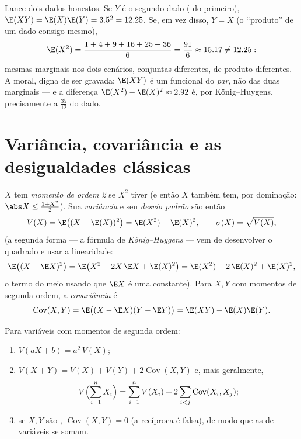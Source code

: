\begin{example}\label{ex:b2:randomvar:productcontrast}
Lance dois dados honestos. Se $Y$ é o segundo dado ( do
primeiro), $\E(XY) = \E(X)\E(Y) = 3.5^2 = 12.25$. Se, em vez disso,
$Y = X$ (o ``produto'' de um dado consigo mesmo),
\[
\E(X^2) = \frac{1 + 4 + 9 + 16 + 25 + 36}{6} = \frac{91}{6}
\approx 15.17 \neq 12.25 :
\]
mesmas  marginais nos dois cenários,  conjuntas diferentes,
 de produto diferentes. A moral, digna de ser gravada:
$\E(XY)$ é um funcional do \emph{par}, não das duas
marginais --- e a diferença $\E(X^2) - \E(X)^2 \approx 2.92$
é, por König--Huygens, precisamente a 
$\frac{35}{12}$ do dado.
\end{example}

\section{Variância, covariância e as desigualdades clássicas}

\begin{definition}\label{def:b2:randomvar:variance}
$X$ tem \emph{momento de ordem 2} se $X^2$ tiver 
(e então $X$ também tem, por dominação: $\abs X \leq \frac{1 +
X^2}{2}$). Sua \emph{variância} e seu \emph{desvio
padrão} são
então
\[
V(X) = \E\bigl((X - \E(X))^2\bigr)
= \E(X^2) - \E(X)^2 ,
\qquad
\sigma(X) = \sqrt{V(X)} ,
\]
(a segunda forma --- a fórmula de \emph{König--Huygens} --- vem de
desenvolver o quadrado e usar a linearidade:
\[
\E\bigl((X - \E X)^2\bigr)
= \E\bigl(X^2 - 2X\,\E X + \E(X)^2\bigr)
= \E(X^2) - 2\,\E(X)^2 + \E(X)^2 ,
\]
o termo do meio usando que $\E X$ é uma constante). Para $X, Y$ com momentos de segunda ordem,
a \emph{covariância} é
\[
\operatorname{Cov}(X, Y)
= \E\bigl((X - \E X)(Y - \E Y)\bigr)
= \E(XY) - \E(X)\E(Y) .
\]
\end{definition}

\begin{theorem}\label{thm:b2:randomvar:variancerules}
Para variáveis com momentos de segunda ordem:
\begin{enumerate}
\item $V(aX + b) = a^2\,V(X)$;
\item $V(X + Y) = V(X) + V(Y) + 2\operatorname{Cov}(X, Y)$ e,
mais geralmente,
\[
V\Bigl(\sum_{i=1}^n X_i\Bigr)
= \sum_{i=1}^n V(X_i)
+ 2\sum_{i < j}\operatorname{Cov}(X_i, X_j) ;
\]
\item se $X, Y$ são , $\operatorname{Cov}(X, Y) = 0$
(a recíproca é falsa), de modo que as  de variáveis 
se somam.
\end{enumerate}
\end{theorem}

